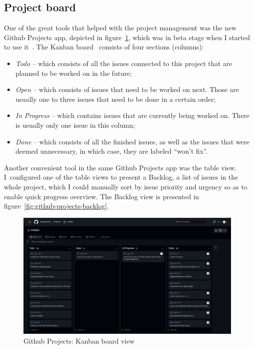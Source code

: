 \subsection{Project board}\label{sec:project-board}

One of the great tools that helped with the project management
was the new Github Projects app,
depicted in figure~\ref{fig:github-projects-kanban},
which was in beta stage
when I started to use it~\cite{github_inc_github_2022}.
The Kanban board~\cite{goddard_kanban_2022} consists of four sections (columns):

\begin{itemize}
      \item
            \textit{Todo} -- which consists of all the issues
            connected to this project
            that are planned to be worked on in the future;
      \item
            \textit{Open} -- which consists of issues
            that need to be worked on next.
            Those are usually one to three issues
            that need to be done in a certain order;
      \item
            \textit{In Progress} -- which contains issues
            that are currently being worked on.
            There is usually only one issue in this column;
      \item
            \textit{Done} -- which consists of all the finished issues,
            as well as the issues that were deemed unnecessary,
            in which case, they are labeled ``won't fix''.
\end{itemize}

Another convenient tool in the same Github Projects app
was the table view.
I~configured one of the table views to present a Backlog,
a list of issues in the whole project,
which I could manually sort by
issue priority and urgency
so as to enable quick progress overview.
The Backlog view is presented in figure~\ref{fig:github-projects-backlog}.

\begin{figure}[!h]
      \centering
      \includegraphics[width=0.99\linewidth,keepaspectratio]{img/kanban_board.jpg}
      \caption{Github Projects: Kanban board view}
      \label{fig:github-projects-kanban}
\end{figure}

